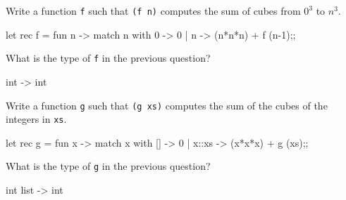 

\renewcommand\AUTHOR{nweadick1@cougars.ccis.edu} %


\topmattertwo

\nextq
Write a function \verb!f! such that \verb!(f n)! computes the sum of cubes
from $0^3$ to $n^3$.
\\
\ANSWER
\begin{answercode}
let rec f = fun n -> match n with 0 -> 0 | n -> (n*n*n) + f (n-1);;
\end{answercode}

\nextq
What is the type of \verb!f! in the previous question?
\\
\ANSWER
\begin{answercode}
int -> int
\end{answercode}

\nextq
Write a function \verb!g! such that \verb!(g xs)!
computes the sum of the cubes of the integers in \verb!xs!.
\\
\ANSWER
\begin{answercode}
let rec g = fun x -> match x with [] -> 0 | x::xs -> (x*x*x) + g (xs);;
\end{answercode}

\nextq
What is the type of \verb!g! in the previous question?
\\
\ANSWER
\begin{answercode}
int list -> int
\end{answercode}

\newpage


